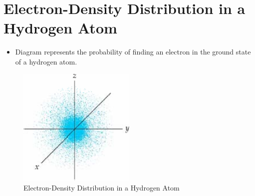 \documentclass[
	chapter=7,
	title={Quantum Theory {\&} the Electronic Structure of Atoms},
	showanswers=true,
]{chem122notes}
\begin{document}
\section{Electron-Density Distribution in a Hydrogen Atom}\label{sec:electron-density-distribution-in-a-hydrogen-atom}
\begin{itemize}
	\item Diagram represents the probability of finding an electron in the ground state of a hydrogen atom.
\end{itemize}
\begin{figure}[H]
	\centering
	\includegraphics[width=0.5\textwidth]{chapter7/electron_density_distribution}
	\caption{Electron-Density Distribution in a Hydrogen Atom}
	\label{fig:electron-density-distribution}
\end{figure}
\end{document}
